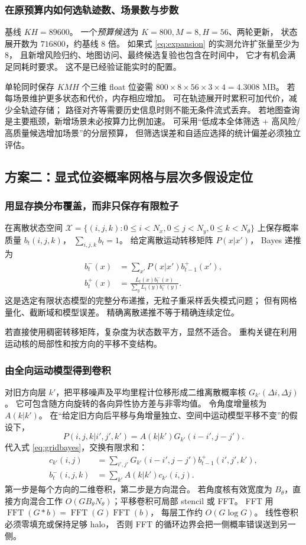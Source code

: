 \subsubsection{在原预算内如何选轨迹数、场景数与步数}
基线 $KH=89600$。
一个\emph{预算候选}为 $K=800,M=8,H=56$、两轮更新，
状态展开数为 $716800$，约基线 8 倍。
如果式 \eqref{eq:expansion} 的实测允许扩张量至少为 8，
且新增风险归约、地图访问、最终候选复验也包含在时间中，
它才有机会满足同耗时要求。
这不是已经验证能实时的配置。

单轮同时保存 $K M H$ 个三维 float 位姿需
$800\times8\times56\times3\times4=4.3008$ MB。
若每场景维护更多状态和代价，内存相应增加。
可在轨迹展开时累积可加代价，减少全轨迹存储；
路径对齐等需要历史信息时则不能无条件流式丢弃。
若地图查询是主要瓶颈，新增场景未必按算力比例加速。
可采用“低成本全体筛选 + 高风险/高质量候选增加场景”的分层预算，
但筛选误差和自适应选择的统计偏差必须独立评估。

\subsection{方案二：显式位姿概率网格与层次多假设定位}
\subsubsection{用显存换分布覆盖，而非只保存有限粒子}
在离散状态空间
$\mathcal X=\{(i,j,k):0\le i<N_x,0\le j<N_y,0\le k<N_\theta\}$
上保存概率质量 $b_t(i,j,k)$，
$\sum_{i,j,k}b_t=1$。
给定离散运动转移矩阵 $P(x|x')$，
Bayes 递推为
\begin{align}
b_t^-(x)&=\sum_{x'}P(x|x')b_{t-1}^+(x'),\\
b_t^+(x)&=\frac{L_t(x)b_t^-(x)}{\sum_yL_t(y)b_t^-(y)}.
\label{eq:gridbayes}
\end{align}
这是选定有限状态模型的完整分布递推，无粒子重采样丢失模式问题；
但有网格量化、截断域和模型误差。
精确离散递推不等于精确连续定位。

若直接使用稠密转移矩阵，复杂度为状态数平方，显然不适合。
重构关键在利用运动核的局部性和按方向的平移不变结构。

\subsubsection{由全向运动模型得到卷积}
对旧方向层 $k'$，把平移噪声及平均里程计位移形成二维离散概率核
$G_{k'}(\Delta i,\Delta j)$。
它可包含随方向旋转的各向异性协方差与非零均值。
令角度增量核为 $A(k|k')$。
在“给定旧方向后平移与角增量独立、空间中运动模型平移不变”的假设下，
\[
P(i,j,k|i',j',k')
=A(k|k')G_{k'}(i-i',j-j').
\]
代入式 \eqref{eq:gridbayes}，交换有限求和：
\begin{align}
c_{k'}(i,j)&=
\sum_{i',j'}G_{k'}(i-i',j-j')b_{t-1}^+(i',j',k'),\\
b_t^-(i,j,k)&=\sum_{k'}A(k|k')c_{k'}(i,j).
\label{eq:convpredict}
\end{align}
第一步是每个方向的二维卷积，第二步是方向混合。
若角度核有效宽度为 $B_\theta$，直接方向混合工作
$O(GB_\theta N_\theta)$；平移卷积可局部 stencil 或 FFT。
FFT 用
$\operatorname{FFT}(G*b)=\operatorname{FFT}(G)\operatorname{FFT}(b)$，
每层工作约 $O(G\log G)$。
线性卷积必须零填充或保持足够 halo，
否则 FFT 的循环边界会把一侧概率错误送到另一侧。

